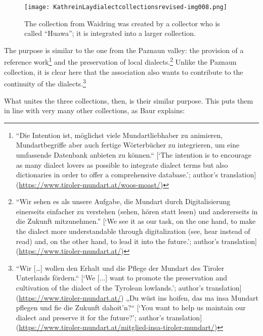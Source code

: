 \documentclass[output=paper]{langscibook}
\begin{document}
  
\begin{figure}
\texttt{[image: KathreinLaydialectcollectionsrevised-img008.png]}
\caption{The collection from Waidring was created by a collector who is called “Huawa”; it is integrated into a larger collection.}
\label{fig:kathrein:8}
\end{figure}

The purpose is similar to the one from the Paznaun valley: the provision of a reference work\footnote{“Die Intention ist, möglichst viele Mundartliebhaber zu animieren, Mundartbegriffe aber auch fertige Wörterbücher zu integrieren, um eine umfassende Datenbank anbieten zu können.“ [‘The intention is to encourage as many dialect lovers as possible to integrate dialect terms but also dictionaries in order to offer a comprehensive database.’; author’s translation] (\url{https://www.tiroler-mundart.at/woos-moast/})} and the preservation of local dialects.\footnote{``Wir sehen es als unsere Aufgabe, die Mundart durch Digitalisierung einerseits einfacher zu verstehen (sehen, hören statt lesen) und andererseits in die Zukunft mitzunehmen.'' [‘We see it as our task, on the one hand, to make the dialect more understandable through digitalization (see, hear instead of read) and, on the other hand, to lead it into the future.’; author’s translation] (\url{https://www.tiroler-mundart.at/})}  Unlike the Paznaun collection, it is clear here that the association also wants to contribute to the continuity of the dialects.\footnote{“Wir […] wollen den Erhalt und die Pflege der Mundart des Tiroler Unterlands fördern.“ [‘We [...] want to promote the preservation and cultivation of the dialect of the Tyrolean lowlands.’; author’s translation] (\url{https://www.tiroler-mundart.at/}) „Du wüst ins hoifen, das ma insa Mundart pflegen und fie die Zukunft dahoit'n?“ [`You want to help us maintain our dialect and preserve it for the future?'; author’s translation] (\url{https://www.tiroler-mundart.at/mitglied-insa-tiroler-mundart/})}

What unites the three collections, then, is their similar purpose. This puts them in line with very many other collections, as Baur explains:
\end{document}
